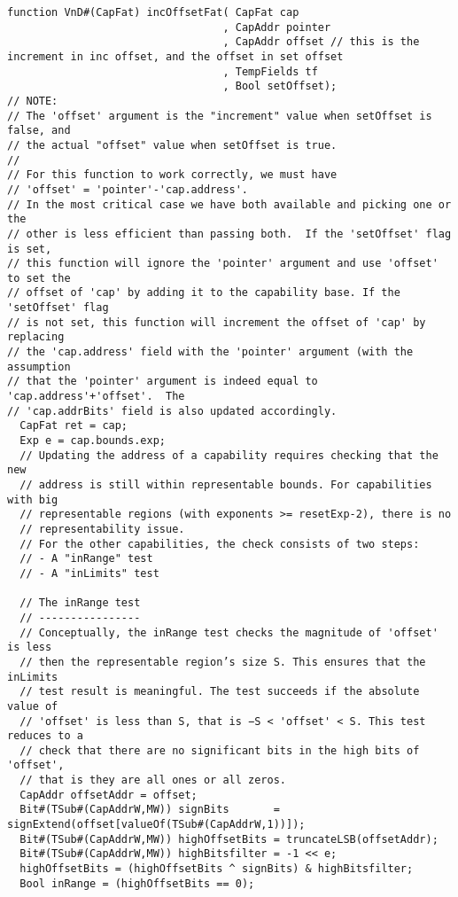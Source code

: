 \begin{lstlisting}[language=bluespec]
function VnD#(CapFat) incOffsetFat( CapFat cap
                                  , CapAddr pointer
                                  , CapAddr offset // this is the increment in inc offset, and the offset in set offset
                                  , TempFields tf
                                  , Bool setOffset);
// NOTE:
// The 'offset' argument is the "increment" value when setOffset is false, and
// the actual "offset" value when setOffset is true.
//
// For this function to work correctly, we must have
// 'offset' = 'pointer'-'cap.address'.
// In the most critical case we have both available and picking one or the
// other is less efficient than passing both.  If the 'setOffset' flag is set,
// this function will ignore the 'pointer' argument and use 'offset' to set the
// offset of 'cap' by adding it to the capability base. If the 'setOffset' flag
// is not set, this function will increment the offset of 'cap' by replacing
// the 'cap.address' field with the 'pointer' argument (with the assumption
// that the 'pointer' argument is indeed equal to 'cap.address'+'offset'.  The
// 'cap.addrBits' field is also updated accordingly.
  CapFat ret = cap;
  Exp e = cap.bounds.exp;
  // Updating the address of a capability requires checking that the new
  // address is still within representable bounds. For capabilities with big
  // representable regions (with exponents >= resetExp-2), there is no
  // representability issue.
  // For the other capabilities, the check consists of two steps:
  // - A "inRange" test
  // - A "inLimits" test

  // The inRange test
  // ----------------
  // Conceptually, the inRange test checks the magnitude of 'offset' is less
  // then the representable region’s size S. This ensures that the inLimits
  // test result is meaningful. The test succeeds if the absolute value of
  // 'offset' is less than S, that is −S < 'offset' < S. This test reduces to a
  // check that there are no significant bits in the high bits of 'offset',
  // that is they are all ones or all zeros.
  CapAddr offsetAddr = offset;
  Bit#(TSub#(CapAddrW,MW)) signBits       = signExtend(offset[valueOf(TSub#(CapAddrW,1))]);
  Bit#(TSub#(CapAddrW,MW)) highOffsetBits = truncateLSB(offsetAddr);
  Bit#(TSub#(CapAddrW,MW)) highBitsfilter = -1 << e;
  highOffsetBits = (highOffsetBits ^ signBits) & highBitsfilter;
  Bool inRange = (highOffsetBits == 0);


\end{lstlisting}
